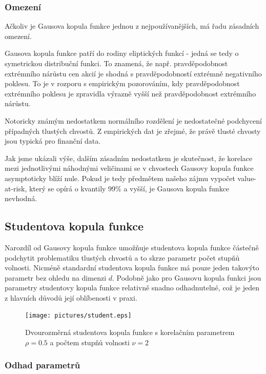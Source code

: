 \subsubsection{Omezení}

Ačkoliv je Gausova kopula funkce jednou z nejpoužívanějších, má řadu zásadních omezení.

Gausova kopula funkce patří do rodiny eliptických funkcí - jedná se tedy o symetrickou distribuční funkci. To znamená, že např. pravděpodobnost extrémního nárůstu cen akcií je shodná s pravděpodobností extrémně negativního poklesu. To je v rozporu s empirickým pozorováním, kdy pravděpodobnost extrémního poklesu je zpravidla výrazně vyšší než pravděpodobnost extrémního nárůstu.

Notoricky známým nedostatkem normálního rozdělení je nedostatečné podchycení případných tlustých chvostů. Z empirických dat je zřejmé, že právě tlusté chvosty jsou typická pro finanční data.

Jak jsme ukázali výše, dalším zásadním nedostatkem je skutečnost, že korelace mezi jednotlivými náhodnými veličinami se v chvostech Gausovy kopula funkce asymptoticky blíží nule. Pokud je tedy předmětem našeho zájmu vypočet value-at-risk, který se opírá o kvantily 99\% a vyšší, je Gausova kopula funkce nevhodná.

\subsection{Studentova kopula funkce}

Narozdíl od Gausovy kopula funkce umožňuje studentova kopula funkce částečně podchytit problematiku tlustých chvostů a to skrze parametr počet stupňů volnosti. Nicméně standardní studentova kopula funkce má pouze jeden takovýto parametr bez ohledu na dimenzi $d$. Podobně jako pro Gausovu kopula funkci jsou parametry studentovy kopula funkce relativně snadno odhadnutelné, což je jeden z hlavních důvodů její oblíbenosti v praxi.

\begin{figure}[htp]
\centering
\texttt{[image: pictures/student.eps]}
\caption{Dvourozměrná studentova kopula funkce s korelačním parametrem $\rho =   0.5$ a počtem stupňů volnosti $\nu = 2$}
\end{figure}

\subsubsection{Odhad parametrů}


